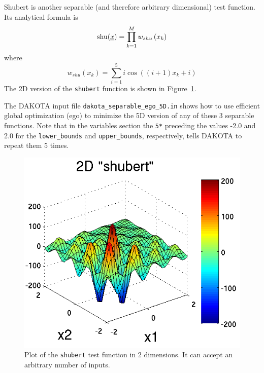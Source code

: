 Shubert is another separable (and therefore arbitrary dimensional) 
test function.  Its analytical formula is
\begin{displaymath}
{\rm shu}(\underline{x})=\prod_{k=1}^M w_{shu}\left(x_k\right)
\end{displaymath}
where 
\begin{displaymath}
w_{shu}\left(x_k\right)=\sum_{i=1}^5 i\cos((i+1)x_k+i)
\end{displaymath}
The 2D version of the \texttt{shubert} function is shown in 
Figure~\ref{fig:2D_shubert}. 

The DAKOTA input file \texttt{dakota\_separable\_ego\_5D.in} shows how
to use efficient global optimization (ego) to minimize the 5D version
of any of these 3 separable functions.  Note that in the variables
section the \texttt{5*} preceding the values -2.0 and 2.0 for the
\texttt{lower\_bounds} and \texttt{upper\_bounds}, respectively, tells
DAKOTA to repeat them 5 times.
\begin{center}
  \begin{small}
    \begin{bigbox}
    \end{bigbox}
  \end{small}
\end{center}

\begin{figure}
  \centering
  \centerline{\includegraphics[scale=1.0]{images/DAK5pt2_2D_shubert}}
  \caption{Plot of the \texttt{shubert} test function in 2 dimensions.
           It can accept an arbitrary number of inputs.}
  \label{fig:2D_shubert}
\end{figure}


